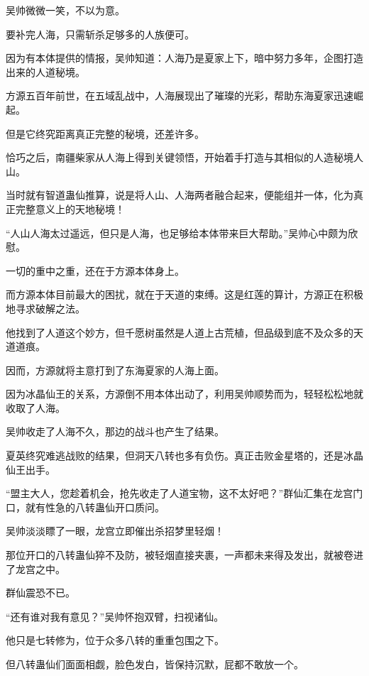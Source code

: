 \begin{this_body}
吴帅微微一笑，不以为意。

要补完人海，只需斩杀足够多的人族便可。

因为有本体提供的情报，吴帅知道：人海乃是夏家上下，暗中努力多年，企图打造出来的人道秘境。

方源五百年前世，在五域乱战中，人海展现出了璀璨的光彩，帮助东海夏家迅速崛起。

但是它终究距离真正完整的秘境，还差许多。

恰巧之后，南疆柴家从人海上得到关键领悟，开始着手打造与其相似的人造秘境人山。

当时就有智道蛊仙推算，说是将人山、人海两者融合起来，便能组并一体，化为真正完整意义上的天地秘境！

“人山人海太过遥远，但只是人海，也足够给本体带来巨大帮助。”吴帅心中颇为欣慰。

一切的重中之重，还在于方源本体身上。

而方源本体目前最大的困扰，就在于天道的束缚。这是红莲的算计，方源正在积极地寻求破解之法。

他找到了人道这个妙方，但千愿树虽然是人道上古荒植，但品级到底不及众多的天道道痕。

因而，方源就将主意打到了东海夏家的人海上面。

因为冰晶仙王的关系，方源倒不用本体出动了，利用吴帅顺势而为，轻轻松松地就收取了人海。

吴帅收走了人海不久，那边的战斗也产生了结果。

夏英终究难逃战败的结果，但洞天八转也多有负伤。真正击败金星塔的，还是冰晶仙王出手。

“盟主大人，您趁着机会，抢先收走了人道宝物，这不太好吧？”群仙汇集在龙宫门口，就有性急的八转蛊仙开口质问。

吴帅淡淡瞟了一眼，龙宫立即催出杀招梦里轻烟！

那位开口的八转蛊仙猝不及防，被轻烟直接夹裹，一声都未来得及发出，就被卷进了龙宫之中。

群仙震恐不已。

“还有谁对我有意见？”吴帅怀抱双臂，扫视诸仙。

他只是七转修为，位于众多八转的重重包围之下。

但八转蛊仙们面面相觑，脸色发白，皆保持沉默，屁都不敢放一个。

\end{this_body}

